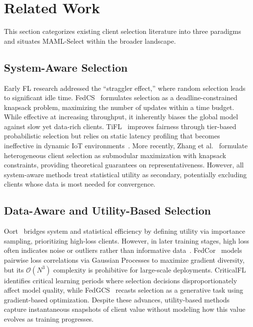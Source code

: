 \documentclass[journal]{IEEEtran}
\begin{document}
\section{Related Work}
This section categorizes existing client selection literature into three paradigms and situates MAML-Select within the broader landscape.

\subsection{System-Aware Selection}
Early FL research addressed the ``straggler effect,'' where random selection leads to significant idle time. FedCS~\cite{nishio2019client} formulates selection as a deadline-constrained knapsack problem, maximizing the number of updates within a time budget. While effective at increasing throughput, it inherently biases the global model against slow yet data-rich clients. TiFL~\cite{chai2020tifl} improves fairness through tier-based probabilistic selection but relies on static latency profiling that becomes ineffective in dynamic IoT environments~\cite{nguyen2021federated}. More recently, Zhang et al.~\cite{zhang2024submodular} formulate heterogeneous client selection as submodular maximization with knapsack constraints, providing theoretical guarantees on representativeness. However, all system-aware methods treat statistical utility as secondary, potentially excluding clients whose data is most needed for convergence.

\subsection{Data-Aware and Utility-Based Selection}
Oort~\cite{lai2021oort} bridges system and statistical efficiency by defining utility via importance sampling, prioritizing high-loss clients. However, in later training stages, high loss often indicates noise or outliers rather than informative data~\cite{bagdasaryan2020how}. FedCor~\cite{tang2022fedcor} models pairwise loss correlations via Gaussian Processes to maximize gradient diversity, but its $\mathcal{O}(N^3)$ complexity is prohibitive for large-scale deployments. CriticalFL~\cite{yan2023criticalfl} identifies critical learning periods where selection decisions disproportionately affect model quality, while FedGCS~\cite{ning2024fedgcs} recasts selection as a generative task using gradient-based optimization. Despite these advances, utility-based methods capture instantaneous snapshots of client value without modeling how this value evolves as training progresses.
\end{document}
